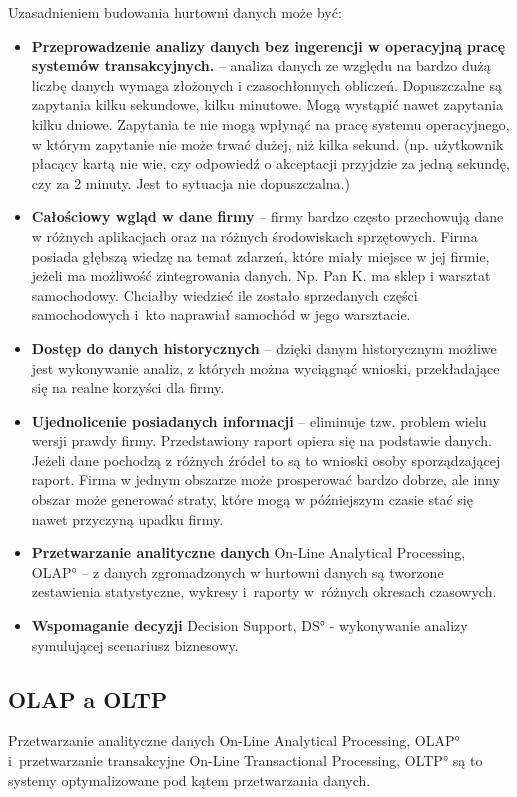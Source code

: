       Uzasadnieniem budowania hurtowni danych może być:
\begin{itemize}
 \item \textbf{Przeprowadzenie analizy danych bez ingerencji w operacyjną pracę systemów transakcyjnych.} --
    analiza danych ze względu na bardzo dużą liczbę danych wymaga złożonych i czasochłonnych obliczeń.
    Dopuszczalne są zapytania kilku sekundowe, kilku minutowe.
    Mogą wystąpić nawet zapytania kilku dniowe. 
    Zapytania te nie mogą wpłynąć na pracę systemu operacyjnego,
     w którym zapytanie nie może trwać dużej, niż kilka sekund.
    (np. użytkownik płacący kartą nie wie, czy odpowiedź o akceptacji przyjdzie za jedną sekundę, 
    czy za 2 minuty.
    Jest to sytuacja nie dopuszczalna.)
\item \textbf{Całościowy wgląd w dane firmy} --
    firmy bardzo często przechowują dane w różnych aplikacjach oraz na różnych środowiskach sprzętowych.
    Firma posiada głębszą wiedzę na temat zdarzeń,
     które miały miejsce w jej firmie,
     jeżeli ma możliwość zintegrowania danych.
    Np. Pan K. ma sklep i warsztat samochodowy.
    Chciałby wiedzieć ile zostało 
     sprzedanych części samochodowych i~kto naprawiał samochód w jego warsztacie.
\item \textbf{Dostęp do danych historycznych} -- 
    dzięki danym historycznym możliwe jest wykonywanie analiz,
    z których można wyciągnąć wnioski, przekładające się na realne korzyści dla firmy.
\item \textbf{Ujednolicenie posiadanych informacji} -- 
   eliminuje tzw. problem wielu wersji prawdy firmy. 
   Przedstawiony raport opiera się na podstawie danych. 
   Jeżeli dane pochodzą z różnych źródeł to są to wnioski osoby sporządzającej raport.
   Firma w jednym obszarze może prosperować bardzo dobrze,
    ale inny obszar może generować straty,
    które mogą w późniejszym czasie stać się nawet przyczyną upadku firmy.

\item \textbf{Przetwarzanie analityczne danych} \ang{On-Line Analytical Processing, OLAP} --  
  z danych zgromadzonych w hurtowni danych są tworzone zestawienia statystyczne,
   wykresy i~raporty w~różnych okresach czasowych.
\item \textbf{Wspomaganie decyzji} \ang{Decision Support, DS} - wykonywanie 
  analizy symulującej scenariusz biznesowy. 
  
\end{itemize}


\subsection{OLAP a OLTP}
Przetwarzanie analityczne danych \ang{On-Line Analytical Processing, OLAP} 
 i~przetwarzanie transakcyjne \ang{On-Line Transactional Processing,  OLTP}
 są to systemy optymalizowane pod kątem przetwarzania danych. \cite{Vincent_Rainardi} \cite{TodMan}

